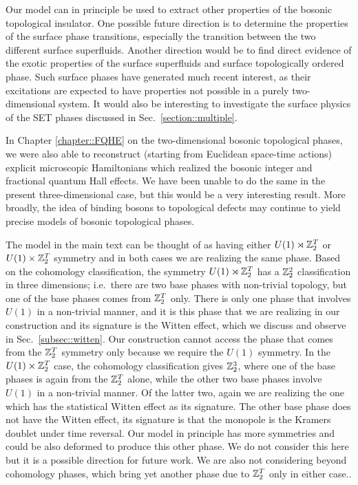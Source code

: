 Our model can in principle be used to extract other properties of the bosonic topological insulator. One possible future direction is to determine the properties of the surface phase transitions, especially the transition between the two different surface superfluids. Another direction would be to find direct evidence of the exotic properties of the surface superfluids and surface topologically ordered phase. Such surface phases have generated much recent interest, as their excitations are expected to have properties not possible in a purely two-dimensional system.\cite{SenthilVishwanath,Chen2014,Cho2014} It would also be interesting to investigate the surface physics of the SET phases discussed in Sec.~\ref{section::multiple}.

In Chapter \ref{chapter::FQHE} on the two-dimensional bosonic topological phases, we were also able to reconstruct (starting from Euclidean space-time actions) explicit microscopic Hamiltonians which realized the bosonic integer and fractional quantum Hall effects. We have been unable to do the same in the present three-dimensional case, but this would be a very interesting result. More broadly, the idea of binding bosons to topological defects may continue to yield precise models of bosonic topological phases.

The model in the main text can be thought of as having either $U(1)\rtimes\mathbb{Z}_2^T$ or $U(1)\times\mathbb{Z}_2^T$ symmetry and in both cases we are realizing the same phase.
Based on the cohomology classification\cite{WenScience,WenPRB}, the symmetry $U(1)\rtimes\mathbb{Z}_2^T$ has a $\mathbb{Z}_2^2$ classification in three dimensions; i.e.~there are two base phases with non-trivial topology, but one of the base phases comes from $\mathbb{Z}_2^T$ only.  There is only one phase that involves $U(1)$ in a non-trivial manner, and it is this phase that we are realizing in our construction and its signature is the Witten effect, which we discuss and observe in Sec.~\ref{subsec::witten}. Our construction cannot access the phase that comes from the $\mathbb{Z}_2^T$ symmetry only because we require the $U(1)$ symmetry.
In the $U(1) \times \mathbb{Z}_2^T$ case, the cohomology classification gives $\mathbb{Z}_2^3$, where one of the base phases is again from the $\mathbb{Z}_2^T$ alone, while the other two base phases involve $U(1)$ in a non-trivial manner.  Of the latter two, again we are realizing the one which has the statistical Witten effect as its signature.  The other base phase does not have the Witten effect, its signature is that the monopole is the Kramers doublet under time reversal.\cite{SenthilVishwanath, BiRasmussenXu}  Our model in principle has more symmetries and could be also deformed to produce this other phase. We do not consider this here but it is a possible direction for future work.  We are also not considering beyond cohomology phases, which bring yet another phase due to $\mathbb{Z}_2^T$ only in either case.\cite{SenthilVishwanath, Kapustin2014}. 



